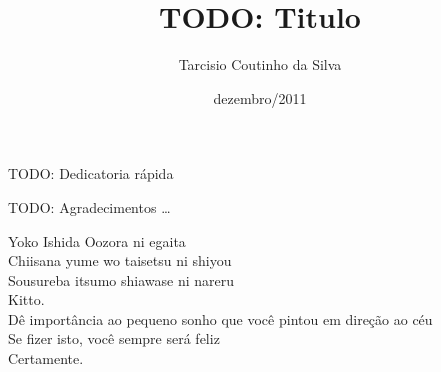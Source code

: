 \documentclass[pt,bsc,oneside,onehalfspacing]{risethesis}
\title{TODO: Titulo}
\date{dezembro/2011}
\author{Tarcisio Coutinho da Silva}
\begin{document}
\frontmatter
\frontpage
\presentationpage

\begin{dedicatory}
TODO: Dedicatoria rápida
\end{dedicatory}

\acknowledgements
TODO: Agradecimentos
\ldots

\begin{epigraph}{Yoko Ishida}
Oozora ni egaita\\
Chiisana yume wo taisetsu ni shiyou\\
Sousureba itsumo shiawase ni nareru\\
Kitto.\\
\vspace{0.5cm}
Dê importância ao pequeno sonho que você pintou em direção ao céu\\
Se fizer isto, você sempre será feliz\\
Certamente.
\vspace{0.2cm}
\end{epigraph}

\resumo


\abstract



\tableofcontents
\listoffigures
\listoftables


\mainmatter








\clearpage
\addappheadtotoc
\appendix
\appendixpage

\end{document}
